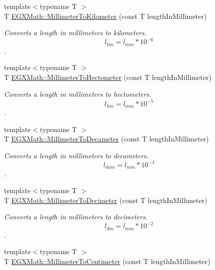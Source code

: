 \begin{DoxyCompactItemize}
{\footnotesize template$<$typename T $>$ }\\T \mbox{\hyperlink{group___e_g_x_math-_conversions-_length_conversions-_millimeter-_s_i_ga1c5b03f2d0745187350584f77f406f13}{E\+G\+X\+Math\+::\+Millimeter\+To\+Kilometer}} (const T length\+In\+Millimeter)
\begin{DoxyCompactList}\small\item\em Converts a length in millimeters to kilometers. \[ l_{km}=l_{mm} * 10^{-6} \]. \end{DoxyCompactList}\item 
{\footnotesize template$<$typename T $>$ }\\T \mbox{\hyperlink{group___e_g_x_math-_conversions-_length_conversions-_millimeter-_s_i_gaa4a0a12379c507ce0ffb4a950174980c}{E\+G\+X\+Math\+::\+Millimeter\+To\+Hectometer}} (const T length\+In\+Millimeter)
\begin{DoxyCompactList}\small\item\em Converts a length in millimeters to hectometers. \[ l_{hm}=l_{mm} * 10^{-5} \]. \end{DoxyCompactList}\item 
{\footnotesize template$<$typename T $>$ }\\T \mbox{\hyperlink{group___e_g_x_math-_conversions-_length_conversions-_millimeter-_s_i_gaf0e54830f6ae997dde95341e87638bf5}{E\+G\+X\+Math\+::\+Millimeter\+To\+Decameter}} (const T length\+In\+Millimeter)
\begin{DoxyCompactList}\small\item\em Converts a length in millimeters to decameters. \[ l_{dam}=l_{mm} * 10^{-4} \]. \end{DoxyCompactList}\item 
{\footnotesize template$<$typename T $>$ }\\T \mbox{\hyperlink{group___e_g_x_math-_conversions-_length_conversions-_millimeter-_s_i_gad38e2be59f56a27e7628cfcbaa4a7df2}{E\+G\+X\+Math\+::\+Millimeter\+To\+Decimeter}} (const T length\+In\+Millimeter)
\begin{DoxyCompactList}\small\item\em Converts a length in millimeters to decimeters. \[ l_{dm}=l_{mm} * 10^{-2} \]. \end{DoxyCompactList}\item 
{\footnotesize template$<$typename T $>$ }\\T \mbox{\hyperlink{group___e_g_x_math-_conversions-_length_conversions-_millimeter-_s_i_gaa77c48215c6c4f46394025af4cb26ead}{E\+G\+X\+Math\+::\+Millimeter\+To\+Centimeter}} (const T length\+In\+Millimeter)

\end{DoxyCompactItemize}

